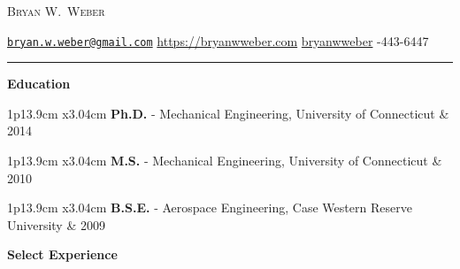 \documentclass[11pt]{article}
\newcommand{\cvsection}[1]
{
\begin{center}
    \large\textcolor{sectcol}{\textbf{#1}}
\end{center}
}
\newcommand{\edevent}[3]
{
\begin{tabular*}{1\textwidth}{p{13.9cm} x{3.04cm}}%
    \textbf{#2} - \textcolor{bgcol}{#3} & \vspace{2.5pt}\textcolor{sectcol}{#1}%
\end{tabular*}

\vspace{-4pt}
}
\providecommand*\emaillink[1]{\nolinkurl{#1}}
\providecommand*\email[1]{\href{mailto:#1}{\emaillink{#1}}}
\begin{document}
\pagestyle{fancy}

\vspace{-8pt}
\begin{center}
    {\HUGE \textsc{Bryan W.\ Weber}}%

    \vspace{3pt}

    \email{bryan.w.weber@gmail.com} \enspace\textbullet\enspace \url{https://bryanwweber.com} \enspace\textbullet\enspace {} \href{https://github.com/bryanwweber}{bryanwweber} \enspace\textbullet{}-443-6447
\end{center}

\vspace{-12pt}
\textcolor{softcol}{\hrule}

\normalsize


\cvsection{Education}

\edevent{2014}{Ph.D.}{Mechanical Engineering, University of Connecticut}
\edevent{2010}{M.S.}{Mechanical Engineering, University of Connecticut}
\edevent{2009}{B.S.E.}{Aerospace Engineering, Case Western Reserve University}

\cvsection{Select Experience}
\end{document}
